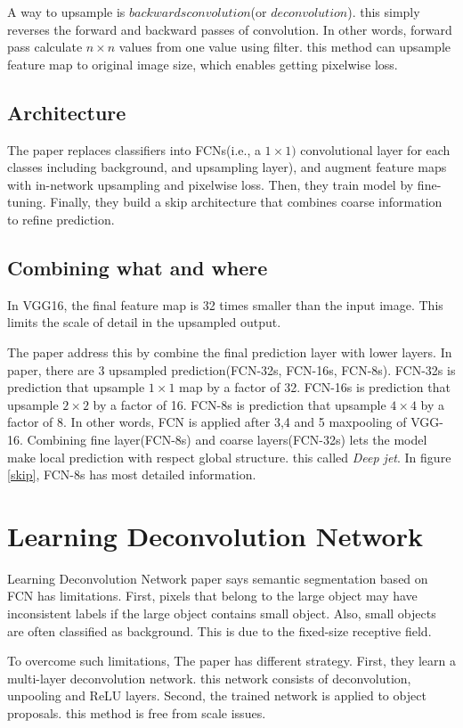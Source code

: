 \documentclass[extendedabs]{bmvc2k}
\begin{document}
A way to upsample is $backwards convolution$(or $deconvolution$). this simply reverses the forward and backward passes of convolution. In other words, forward pass calculate $n\times n$ values from one value using filter. this method can upsample feature map to original image size, which enables getting pixelwise loss.

\subsection{Architecture}
The paper replaces classifiers into FCNs(i.e., a $1\times1)$ convolutional layer for each classes including background, and upsampling layer), and augment feature maps with in-network upsampling and pixelwise loss. Then, they train model by fine-tuning. Finally, they build a skip architecture that combines coarse information to refine prediction.

\subsection{Combining what and where}
In VGG16\cite{vgg}, the final feature map is 32 times smaller than the input image. This limits the scale of detail in the upsampled output.

The paper address this by combine the final prediction layer with lower layers. In paper, there are 3 upsampled prediction(FCN-32s, FCN-16s, FCN-8s). FCN-32s is prediction that upsample $1\times1$ map by a factor of 32. FCN-16s is prediction that upsample $2\times2$ by a factor of 16. FCN-8s is prediction that upsample $4\times4$ by a factor of 8. In other words, FCN is applied after 3,4 and 5 maxpooling of VGG-16\cite{vgg}. Combining fine layer(FCN-8s) and coarse layers(FCN-32s) lets the model make local prediction with respect global structure. this called \textit{Deep jet}. In figure \ref{skip}, FCN-8s has most detailed information.

\section{Learning Deconvolution Network}
Learning Deconvolution Network paper\cite{learndeconv} says semantic segmentation based on FCN\cite{fullyconvnet} has limitations. First, pixels that belong to the large object may have inconsistent labels if the large object contains small object. Also, small objects are often classified as background. This is due to the fixed-size receptive field.

To overcome such limitations, The paper\cite{learndeconv} has different strategy. First, they learn a multi-layer deconvolution network. this network consists of deconvolution, unpooling and ReLU layers. Second, the trained network is applied to object proposals. this method is free from scale issues.
\end{document}
